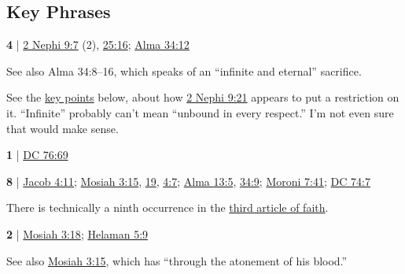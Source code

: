 		\begin{compactdesc}
			\item[]
		\end{compactdesc}
		
\subsection{Key Phrases} %
	\label{ATONEMENT-PHRASES}

	\begin{compactdesc}
		\item[infinite atonement] \textbf{4} | \hyperref[2NEPHI-9-7]{2 Nephi 9:7} (2), \hyperref[2NEPHI-25-16]{25:16}; \hyperref[ALMA-34-12]{Alma 34:12}
			\begin{compactdesc}
				\item[Commentary] See also Alma 34:8--16, which speaks of an ``infinite and eternal'' sacrifice.
					\begin{compactitem}
						\item See the \hyperref[ATONEMENT-KEYS]{key points} below, about how \hyperref[2NEPHI-9-21]{2 Nephi 9:21} appears to put a restriction on it. ``Infinite'' probably can't mean ``unbound in every respect.'' I'm not even sure that would make sense. 
					\end{compactitem}
			\end{compactdesc}
		\item[perfect atonement] \textbf{1} | \hyperref[DC76-69]{DC 76:69}
		\item[power of (the) atonement] 
		\item[through the atonement] \textbf{8} | \hyperref[JACOB-4-11]{Jacob 4:11}; \hyperref[MOSIAH-3-15]{Mosiah 3:15}, \hyperref[MOSIAH-3-19]{19}, \hyperref[MOSIAH-4-7]{4:7}; \hyperref[ALMA-13-5]{Alma 13:5}, \hyperref[ALMA-34-9]{34:9}; \hyperref[MORONI-7-41]{Moroni 7:41}; \hyperref[DC74-7]{DC 74:7}
			\begin{compactdesc}
				\item[Commentary] There is technically a ninth occurrence in the \hyperref[ARTICLESOFFAITH-3]{third article of faith}. 
			\end{compactdesc}
		\item[through the atoning blood] \textbf{2} | \hyperref[MOSIAH-3-18]{Mosiah 3:18}; \hyperref[HELAMAN-5-9]{Helaman 5:9}
			\begin{compactdesc}
				\item[Commentary] See also \hyperref[MOSIAH-3-15]{Mosiah 3:15}, which has ``through the atonement of his blood.''
			\end{compactdesc}
	\end{compactdesc}
	
